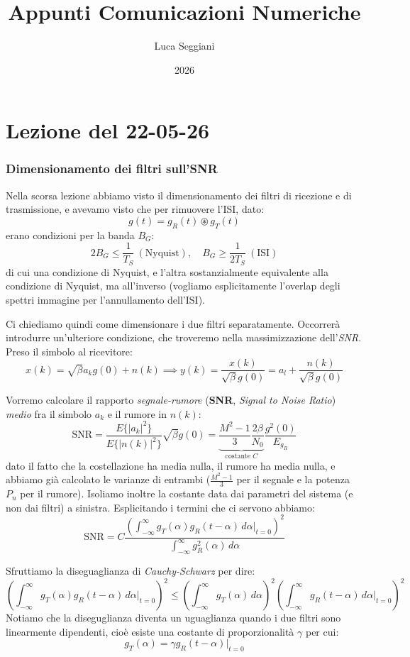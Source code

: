 \documentclass[a4paper,11pt]{article}
\title{Appunti Comunicazioni Numeriche}
\author{Luca Seggiani}
\date{2026}
\begin{document}
\section{Lezione del 22-05-26}

\thispagestyle{empty}
\pagestyle{fancy}

\subsubsection{Dimensionamento dei filtri sull'SNR}
Nella scorsa lezione abbiamo visto il dimensionamento dei filtri di ricezione e di trasmissione, e avevamo visto che per rimuovere l'ISI, dato:
$$
g(t) = g_R(t) \circledast g_T(t)
$$
erano condizioni per la banda $B_G$:
$$
2B_G \leq \frac{1}{T_S} \ (\text{Nyquist})
, \quad
B_G \geq \frac{1}{2 T_S} \ (\text{ISI})
$$
di cui una condizione di Nyquist, e l'altra sostanzialmente equivalente alla condizione di Nyquist, ma all'inverso (vogliamo esplicitamente l'overlap degli spettri immagine per l'annullamento dell'ISI).

Ci chiediamo quindi come dimensionare i due filtri separatamente. Occorrerà introdurre un'ulteriore condizione, che troveremo nella massimizzazione dell'\textit{SNR}. Preso il simbolo al ricevitore:
$$
x(k) = \sqrt{\beta} a_k g(0) + n(k) \implies y(k) = \frac{x(k)}{\sqrt{\beta} g(0)} = a_l + \frac{n(k)}{\sqrt{\beta} g(0)}
$$

Vorremo calcolare il rapporto \textit{segnale-rumore} (\textbf{SNR}, \textit{Signal to Noise Ratio}) \textit{medio} fra il simbolo $a_k$ e il rumore in $n(k)$:
$$
\mathrm{SNR} = \frac{E \{ |a_k|^2 \}}{ E \{ |n(k)|^2 \} } \sqrt{\beta} g(0) = \underbrace{\frac{M^2 - 1}{3} \frac{2\beta}{N_0}}_\text{costante $C$} \frac{g^2(0)}{E_{g_R}}
$$
dato il fatto che la costellazione ha media nulla, il rumore ha media nulla, e abbiamo già calcolato le varianze di entrambi ($\frac{M^2 - 1}{3}$ per il segnale e la potenza $P_n$ per il rumore). Isoliamo inoltre la costante data dai parametri del sistema (e non dai filtri) a sinistra.
Esplicitando i termini che ci servono abbiamo:
$$
\mathrm{SNR} = C \frac{ \left( \int_{-\infty}^{\infty} g_T(\alpha) g_R(t - \alpha) \, d\alpha \big|_{t = 0} \right)^2 }{ \int_{-\infty}^{\infty} g_R^2 (\alpha) \, d\alpha }
$$

Sfruttiamo la diseguaglianza di \textit{Cauchy-Schwarz} per dire:
$$
\left( \int_{-\infty}^{\infty} g_T(\alpha) g_R(t - \alpha) \, d\alpha \Big|_{t = 0} \right)^2 \leq \left( \int_{-\infty}^{\infty} g_T(\alpha) \, d\alpha \right)^2 \left( \int_{-\infty}^{\infty} g_R(t - \alpha) \, d\alpha \Big|_{t = 0} \right)^2
$$
Notiamo che la diseguglianza diventa un uguaglianza quando i due filtri sono linearmente dipendenti, cioè esiste una costante di proporzionalità $\gamma$ per cui:
$$
g_T(\alpha) = \gamma g_R(t - \alpha) \Big|_{t = 0}
$$
\end{document}
